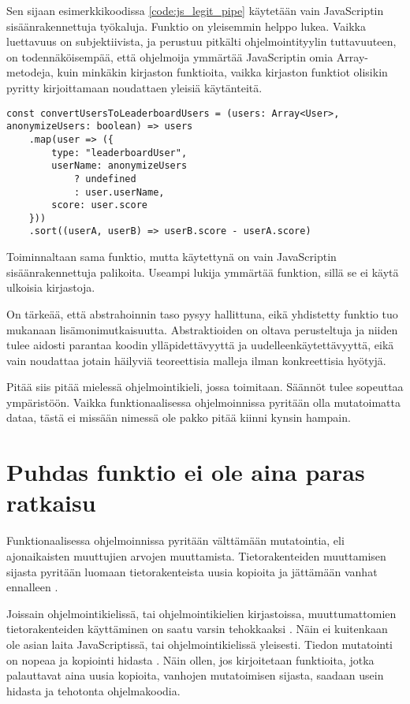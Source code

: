Sen sijaan esimerkkikoodissa \ref{code:js_legit_pipe} käytetään vain JavaScriptin sisäänrakennettuja työkaluja. Funktio on yleisemmin helppo lukea. Vaikka luettavuus on subjektiivista, ja perustuu pitkälti ohjelmointityylin tuttavuuteen, on todennäköisempää, että ohjelmoija ymmärtää JavaScriptin omia Array-metodeja, kuin minkäkin kirjaston funktioita, vaikka kirjaston funktiot olisikin pyritty kirjoittamaan noudattaen yleisiä käytänteitä.

\begin{code}
    \begin{verbatim}
const convertUsersToLeaderboardUsers = (users: Array<User>, anonymizeUsers: boolean) => users
    .map(user => ({
        type: "leaderboardUser",
        userName: anonymizeUsers 
            ? undefined 
            : user.userName,
        score: user.score
    }))
    .sort((userA, userB) => userB.score - userA.score)
    \end{verbatim}
    \caption{Toiminnaltaan sama funktio, mutta käytettynä on vain JavaScriptin sisäänrakennettuja palikoita. Useampi lukija ymmärtää funktion, sillä se ei käytä ulkoisia kirjastoja.}
    \label{code:js_legit_pipe}
\end{code}


On tärkeää, että abstrahoinnin taso pysyy hallittuna, eikä yhdistetty funktio tuo mukanaan lisämonimutkaisuutta. Abstraktioiden on oltava perusteltuja ja niiden tulee aidosti parantaa koodin ylläpidettävyyttä ja uudelleenkäytettävyyttä, eikä vain noudattaa jotain häilyviä teoreettisia malleja ilman konkreettisia hyötyjä.


Pitää siis pitää mielessä ohjelmointikieli, jossa toimitaan. Säännöt tulee sopeuttaa ympäristöön. Vaikka funktionaalisessa ohjelmoinnissa pyritään olla mutatoimatta dataa, tästä ei missään nimessä ole pakko pitää kiinni kynsin hampain.

\section{Puhdas funktio ei ole aina paras ratkaisu}

Funktionaalisessa ohjelmoinnissa pyritään välttämään mutatointia, eli ajonaikaisten muuttujien arvojen muuttamista. Tietorakenteiden muuttamisen sijasta pyritään luomaan tietorakenteista uusia kopioita ja jättämään vanhat ennalleen \cite{immutablejs_immutable,hickey_persistent_2009}.

Joissain ohjelmointikielissä, tai ohjelmointikielien kirjastoissa, muuttumattomien tietorakenteiden käyttäminen on saatu varsin tehokkaaksi \cite{hickey_persistent_2009,immutablejs_immutable}. Näin ei kuitenkaan ole asian laita JavaScriptissä, tai ohjelmointikielissä yleisesti. Tiedon mutatointi on nopeaa ja kopiointi hidasta \cite{turner_trauring_copying_2020}. Näin ollen, jos kirjoitetaan funktioita, jotka palauttavat aina uusia kopioita, vanhojen mutatoimisen sijasta, saadaan usein hidasta ja tehotonta ohjelmakoodia.

